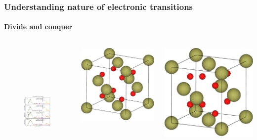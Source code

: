 \documentclass{beamer}
\begin{document}
\begin{frame}
    \frametitle{Understanding nature of electronic transitions}
    \framesubtitle{Divide and conquer}

	\begin{columns}[c]
	\vspace{-0.5cm}

    \begin{figure}
	\includegraphics[height=6.8cm]{figures/cubic-eps.pdf}
	\end{figure}

	\includegraphics[width=0.75\linewidth]{figures/cubic.pdf}

	\includegraphics[width=0.75\linewidth]{figures/tetragonal.pdf}


\end{columns}
\end{frame}
\end{document}
